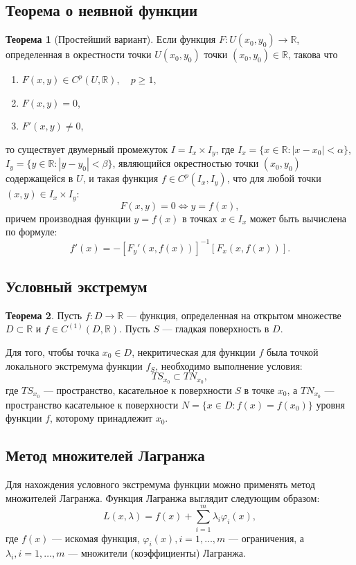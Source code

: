 \documentclass[12pt]{report}
\theoremstyle{definition}
\newtheorem{theorem}{Теорема}[chapter]
\newcommand{\R}{\mathbb R}
\begin{document}
\subsection{Теорема о неявной функции}
\begin{theorem}[Простейший вариант]
Если функция $F: U(x_0, y_0) \rightarrow \R$, определенная в окрестности
точки $U(x_0, y_0)$ точки $(x_0, y_0) \in \R$, такова что
\begin{enumerate}
\item $F(x, y) \in C^p(U, \R),\quad p \ge 1$,
\item $F(x, y) = 0$,
\item $F'(x, y) \ne 0$,
\end{enumerate}
то существует двумерный промежуток $I = I_x \times I_y$, где
$I_x = \{x \in \R: |x - x_0| < \alpha\}$, $I_y = \{y \in \R: |y - y_0| < \beta\}$,
являющийся окрестностью точки $(x_0, y_0)$ содержащейся в $U$, и такая функция
$f \in C^p(I_x, I_y)$, что для любой точки $(x, y) \in I_x \times I_y$:
$$
F(x, y) = 0 \Leftrightarrow y = f(x),
$$
причем производная функции $y=f(x)$ в точках $x \in I_x$ может быть вычислена по формуле:
$$
f'(x) = -[F_y'(x, f(x))]^{-1} [F_x(x, f(x))].
$$
\end{theorem}

\subsection{Условный экстремум}
\begin{theorem}
Пусть $f: D \rightarrow \R$ --- функция, определенная на открытом множестве
$D \subset \R$ и $f \in C^{(1)}(D, \R)$. Пусть $S$ --- гладкая поверхность в
$D$.

Для того, чтобы точка $x_0 \in D$, некритическая для функции $f$ была точкой локального
экстремума функции $f_S$, необходимо выполнение условия:
$$
TS_{x_0} \subset TN_{x_0},
$$
где $TS_{x_0}$ --- пространство, касательное к поверхности $S$ в точке $x_0$, а
$TN_{x_0}$ --- пространство касательное к поверхности $N = \{ x \in D: f(x) = f(x_0) \}$
уровня функции $f$, которому принадлежит $x_0$.
\end{theorem}

\subsection{Метод множителей Лагранжа}
Для нахождения условного экстремума функции можно применять метод множителей
Лагранжа. Функция Лагранжа выглядит следующим образом:
$$
L(x, \lambda) = f(x) + \sum\limits_{i=1}^{m} \lambda_i \varphi_i(x),
$$
где $f(x)$ --- искомая функция, $\varphi_i(x), i = 1, \dots, m$ --- ограничения,
а $\lambda_i, i = 1, \dots, m$ --- множители (коэффициенты) Лагранжа.
\end{document}
